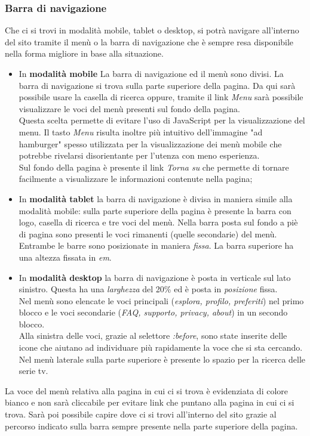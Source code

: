 \subsubsection{Barra di navigazione}
Che ci si trovi in modalità mobile, tablet o desktop, si potrà navigare all'interno del sito tramite il menù o la barra di navigazione che è sempre resa disponibile nella forma migliore in base alla situazione.\\
\begin{itemize}
	\item In \textbf{modalità mobile} La barra di navigazione ed il menù sono divisi. La barra di navigazione si trova sulla parte superiore della pagina. Da qui sarà possibile usare la casella di ricerca oppure, tramite il link \textit{Menu} sarà possibile visualizzare le voci del menù presenti sul fondo della pagina.\\
	Questa scelta permette di evitare l'uso di JavaScript per la visualizzazione del menu. Il tasto \textit{Menu} risulta inoltre più intuitivo dell'immagine "ad hamburger" spesso utilizzata per la visualizzazione dei menù mobile che potrebbe rivelarsi disorientante per l'utenza con meno esperienza.\\
	Sul fondo della pagina è presente il link \textit{Torna su} che permette di tornare facilmente a visualizzare le informazioni contenute nella pagina;
	
	\item In \textbf{modalità tablet} la barra di navigazione è divisa in maniera simile alla modalità mobile: sulla parte superiore della pagina è presente la barra con logo, casella di ricerca e tre voci del menù. Nella barra posta sul fondo a piè di pagina sono presenti le voci rimanenti (quelle secondarie) del menù. \\
	Entrambe le barre sono posizionate in maniera \textit{fissa}. La barra superiore ha una altezza fissata in \textit{em}.\\
	
	\item In \textbf{modalità desktop} la barra di navigazione è posta in verticale sul lato sinistro. Questa ha una \textit{larghezza} del 20\% ed è posta in \textit{posizione} fissa.\\
	Nel menù sono elencate le voci principali (\textit{esplora, profilo, preferiti}) nel primo blocco e le voci secondarie (\textit{FAQ, supporto, privacy, about}) in un secondo blocco.\\
	Alla sinistra delle voci, grazie al selettore \textit{:before}, sono state inserite delle icone che aiutano ad individuare più rapidamente la voce che si sta cercando.\\
	Nel menù laterale sulla parte superiore è presente lo spazio per la ricerca delle serie tv.
\end{itemize}
	La voce del menù relativa alla pagina in cui ci si trova è evidenziata di colore bianco e non sarà cliccabile per evitare link che puntano alla pagina in cui ci si trova.
	Sarà poi possibile capire dove ci si trovi all'interno del sito grazie al percorso indicato sulla barra sempre presente nella parte superiore della pagina.

